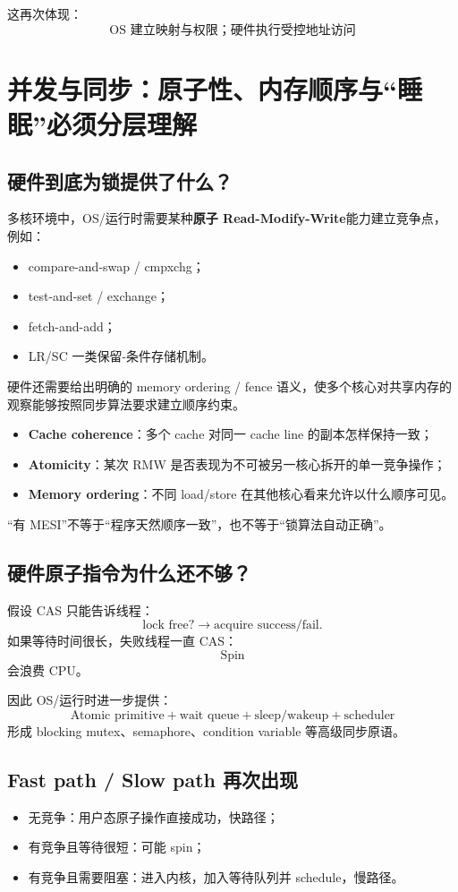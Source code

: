 \documentclass[11pt,a4paper]{ctexart}
\newcommand{\kw}[1]{\textbf{#1}}
\begin{document}
这再次体现：
\[
\boxed{\text{OS 建立映射与权限；硬件执行受控地址访问}}
\]

\section{并发与同步：原子性、内存顺序与“睡眠”必须分层理解}

\subsection{硬件到底为锁提供了什么？}
多核环境中，OS/运行时需要某种\kw{原子 Read-Modify-Write}能力建立竞争点，例如：
\begin{itemize}
  \item compare-and-swap / cmpxchg；
  \item test-and-set / exchange；
  \item fetch-and-add；
  \item LR/SC 一类保留-条件存储机制。
\end{itemize}

硬件还需要给出明确的 memory ordering / fence 语义，使多个核心对共享内存的观察能够按照同步算法要求建立顺序约束。

\begin{bridge}[三个概念不要揉成一个]
\begin{itemize}
  \item \kw{Cache coherence}：多个 cache 对同一 cache line 的副本怎样保持一致；
  \item \kw{Atomicity}：某次 RMW 是否表现为不可被另一核心拆开的单一竞争操作；
  \item \kw{Memory ordering}：不同 load/store 在其他核心看来允许以什么顺序可见。
\end{itemize}
“有 MESI”不等于“程序天然顺序一致”，也不等于“锁算法自动正确”。
\end{bridge}

\subsection{硬件原子指令为什么还不够？}
假设 CAS 只能告诉线程：
\[
\text{lock free?}\rightarrow\text{acquire success/fail}.
\]
如果等待时间很长，失败线程一直 CAS：
\[
\boxed{\text{Spin}}
\]
会浪费 CPU。

因此 OS/运行时进一步提供：
\[
\boxed{
\text{Atomic primitive}
+
\text{wait queue}
+
\text{sleep/wakeup}
+
\text{scheduler}
}
\]
形成 blocking mutex、semaphore、condition variable 等高级同步原语。

\subsection{Fast path / Slow path 再次出现}
\begin{itemize}
  \item 无竞争：用户态原子操作直接成功，快路径；
  \item 有竞争且等待很短：可能 spin；
  \item 有竞争且需要阻塞：进入内核，加入等待队列并 schedule，慢路径。
\end{itemize}
\end{document}
